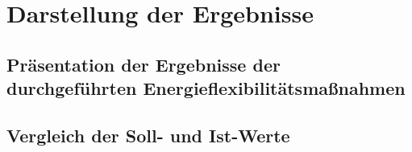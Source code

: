 \section{Darstellung der Ergebnisse}
\label{ch_08Darstellung der Ergebnisse}

\subsection{Präsentation der Ergebnisse der durchgeführten Energieflexibilitätsmaßnahmen}
\label{ch_08Präsentation der Ergebnisse der durchgeführten Energieflexibilitätsmaßnahmen}

\subsection{Vergleich der Soll- und Ist-Werte}
\label{ch_08Vergleich der Soll- und Ist-Werte}

